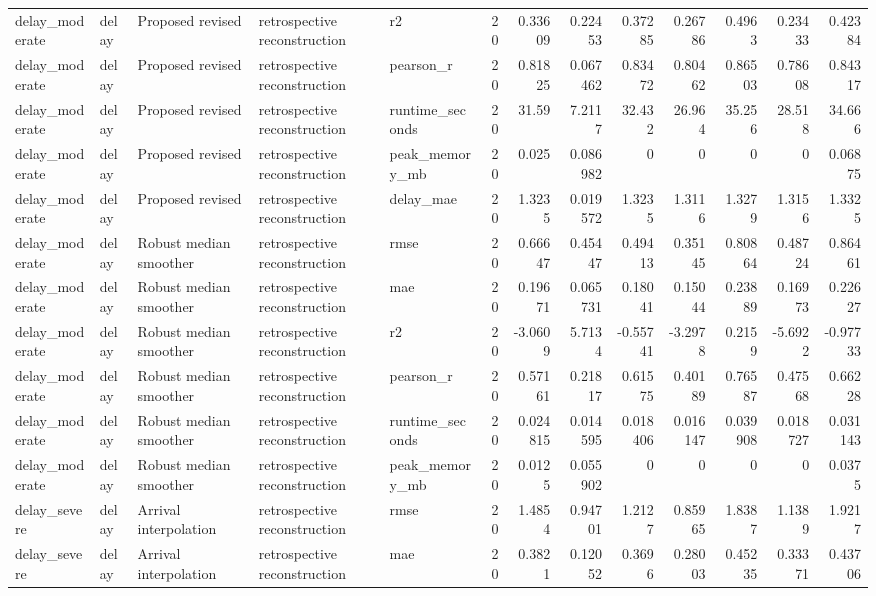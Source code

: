 \begin{table}[!htbp]
{{\begin{tabular}{lllllrrrrrrrr}
delay_moderate & delay & Proposed revised & retrospective reconstruction & r2 & 20 & 0.33609 & 0.22453 & 0.37285 & 0.26786 & 0.4963 & 0.23433 & 0.42384 \\
delay_moderate & delay & Proposed revised & retrospective reconstruction & pearson_r & 20 & 0.81825 & 0.067462 & 0.83472 & 0.80462 & 0.86503 & 0.78608 & 0.84317 \\
delay_moderate & delay & Proposed revised & retrospective reconstruction & runtime_seconds & 20 & 31.59 & 7.2117 & 32.432 & 26.964 & 35.256 & 28.518 & 34.666 \\
delay_moderate & delay & Proposed revised & retrospective reconstruction & peak_memory_mb & 20 & 0.025 & 0.086982 & 0 & 0 & 0 & 0 & 0.06875 \\
delay_moderate & delay & Proposed revised & retrospective reconstruction & delay_mae & 20 & 1.3235 & 0.019572 & 1.3235 & 1.3116 & 1.3279 & 1.3156 & 1.3325 \\
delay_moderate & delay & Robust median smoother & retrospective reconstruction & rmse & 20 & 0.66647 & 0.45447 & 0.49413 & 0.35145 & 0.80864 & 0.48724 & 0.86461 \\
delay_moderate & delay & Robust median smoother & retrospective reconstruction & mae & 20 & 0.19671 & 0.065731 & 0.18041 & 0.15044 & 0.23889 & 0.16973 & 0.22627 \\
delay_moderate & delay & Robust median smoother & retrospective reconstruction & r2 & 20 & -3.0609 & 5.7134 & -0.55741 & -3.2978 & 0.2159 & -5.6922 & -0.97733 \\
delay_moderate & delay & Robust median smoother & retrospective reconstruction & pearson_r & 20 & 0.57161 & 0.21817 & 0.61575 & 0.40189 & 0.76587 & 0.47568 & 0.66228 \\
delay_moderate & delay & Robust median smoother & retrospective reconstruction & runtime_seconds & 20 & 0.024815 & 0.014595 & 0.018406 & 0.016147 & 0.039908 & 0.018727 & 0.031143 \\
delay_moderate & delay & Robust median smoother & retrospective reconstruction & peak_memory_mb & 20 & 0.0125 & 0.055902 & 0 & 0 & 0 & 0 & 0.0375 \\
delay_severe & delay & Arrival interpolation & retrospective reconstruction & rmse & 20 & 1.4854 & 0.94701 & 1.2127 & 0.85965 & 1.8387 & 1.1389 & 1.9217 \\
delay_severe & delay & Arrival interpolation & retrospective reconstruction & mae & 20 & 0.3821 & 0.12052 & 0.3696 & 0.28003 & 0.45235 & 0.33371 & 0.43706 \\

\end{tabular}}}
\end{table}
